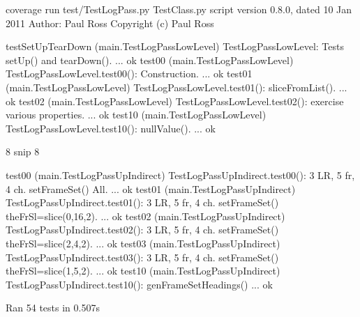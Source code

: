 \documentclass[letterpaper,10pt,english]{sphinxmanual}
\begin{document}
\begin{sphinxVerbatim}[commandchars=\\\{\}]
\PYGZdl{} coverage run test/TestLogPass.py
TestClass.py script version \PYGZdq{}0.8.0\PYGZdq{}, dated 10 Jan 2011
Author: Paul Ross
Copyright (c) Paul Ross

testSetUpTearDown (\PYGZus{}\PYGZus{}main\PYGZus{}\PYGZus{}.TestLogPass\PYGZus{}LowLevel)
TestLogPass\PYGZus{}LowLevel: Tests setUp() and tearDown(). ... ok
test\PYGZus{}00 (\PYGZus{}\PYGZus{}main\PYGZus{}\PYGZus{}.TestLogPass\PYGZus{}LowLevel)
TestLogPass\PYGZus{}LowLevel.test\PYGZus{}00(): Construction. ... ok
test\PYGZus{}01 (\PYGZus{}\PYGZus{}main\PYGZus{}\PYGZus{}.TestLogPass\PYGZus{}LowLevel)
TestLogPass\PYGZus{}LowLevel.test\PYGZus{}01(): \PYGZus{}sliceFromList(). ... ok
test\PYGZus{}02 (\PYGZus{}\PYGZus{}main\PYGZus{}\PYGZus{}.TestLogPass\PYGZus{}LowLevel)
TestLogPass\PYGZus{}LowLevel.test\PYGZus{}02(): exercise various properties. ... ok
test\PYGZus{}10 (\PYGZus{}\PYGZus{}main\PYGZus{}\PYGZus{}.TestLogPass\PYGZus{}LowLevel)
TestLogPass\PYGZus{}LowLevel.test\PYGZus{}10(): nullValue(). ... ok

8\PYGZlt{}\PYGZhy{}\PYGZhy{}\PYGZhy{}\PYGZhy{}\PYGZhy{}\PYGZhy{}\PYGZhy{}\PYGZhy{}\PYGZhy{}\PYGZhy{}\PYGZhy{}\PYGZhy{}\PYGZhy{}\PYGZhy{} snip \PYGZhy{}\PYGZhy{}\PYGZhy{}\PYGZhy{}\PYGZhy{}\PYGZhy{}\PYGZhy{}\PYGZhy{}\PYGZhy{}\PYGZhy{}\PYGZhy{}\PYGZhy{}\PYGZhy{}\PYGZhy{}\PYGZhy{}\PYGZhy{}\PYGZhy{}\PYGZhy{}\PYGZgt{}8

test\PYGZus{}00 (\PYGZus{}\PYGZus{}main\PYGZus{}\PYGZus{}.TestLogPass\PYGZus{}UpIndirect)
TestLogPass\PYGZus{}UpIndirect.test\PYGZus{}00(): 3 LR, 5 fr, 4 ch. setFrameSet() All. ... ok
test\PYGZus{}01 (\PYGZus{}\PYGZus{}main\PYGZus{}\PYGZus{}.TestLogPass\PYGZus{}UpIndirect)
TestLogPass\PYGZus{}UpIndirect.test\PYGZus{}01(): 3 LR, 5 fr, 4 ch. setFrameSet() theFrSl=slice(0,16,2). ... ok
test\PYGZus{}02 (\PYGZus{}\PYGZus{}main\PYGZus{}\PYGZus{}.TestLogPass\PYGZus{}UpIndirect)
TestLogPass\PYGZus{}UpIndirect.test\PYGZus{}02(): 3 LR, 5 fr, 4 ch. setFrameSet() theFrSl=slice(2,4,2). ... ok
test\PYGZus{}03 (\PYGZus{}\PYGZus{}main\PYGZus{}\PYGZus{}.TestLogPass\PYGZus{}UpIndirect)
TestLogPass\PYGZus{}UpIndirect.test\PYGZus{}03(): 3 LR, 5 fr, 4 ch. setFrameSet() theFrSl=slice(1,5,2). ... ok
test\PYGZus{}10 (\PYGZus{}\PYGZus{}main\PYGZus{}\PYGZus{}.TestLogPass\PYGZus{}UpIndirect)
TestLogPass\PYGZus{}UpIndirect.test\PYGZus{}10(): genFrameSetHeadings() ... ok

\PYGZhy{}\PYGZhy{}\PYGZhy{}\PYGZhy{}\PYGZhy{}\PYGZhy{}\PYGZhy{}\PYGZhy{}\PYGZhy{}\PYGZhy{}\PYGZhy{}\PYGZhy{}\PYGZhy{}\PYGZhy{}\PYGZhy{}\PYGZhy{}\PYGZhy{}\PYGZhy{}\PYGZhy{}\PYGZhy{}\PYGZhy{}\PYGZhy{}\PYGZhy{}\PYGZhy{}\PYGZhy{}\PYGZhy{}\PYGZhy{}\PYGZhy{}\PYGZhy{}\PYGZhy{}\PYGZhy{}\PYGZhy{}\PYGZhy{}\PYGZhy{}\PYGZhy{}\PYGZhy{}\PYGZhy{}\PYGZhy{}\PYGZhy{}\PYGZhy{}\PYGZhy{}\PYGZhy{}\PYGZhy{}\PYGZhy{}\PYGZhy{}\PYGZhy{}\PYGZhy{}\PYGZhy{}\PYGZhy{}\PYGZhy{}\PYGZhy{}\PYGZhy{}\PYGZhy{}\PYGZhy{}\PYGZhy{}\PYGZhy{}\PYGZhy{}\PYGZhy{}\PYGZhy{}\PYGZhy{}\PYGZhy{}\PYGZhy{}\PYGZhy{}\PYGZhy{}\PYGZhy{}\PYGZhy{}\PYGZhy{}\PYGZhy{}\PYGZhy{}\PYGZhy{}
Ran 54 tests in 0.507s


\end{sphinxVerbatim}
\end{document}

